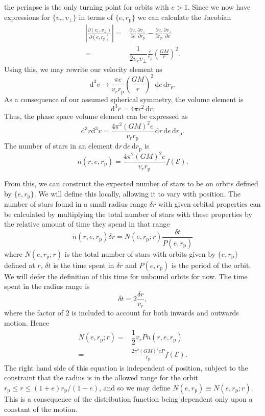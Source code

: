 \documentclass[useAMS,usedcolumn,usegraphicx,usenatbib]{mn2e}
\newcommand{\sub}[1]{\ensuremath{_\mathrm{#1}}}
\newcommand{\dd}{\ensuremath{\mathrm{d}}}
\newcommand{\partialdiff}[2]{\ensuremath{\frac{\partial {#1}}{\partial {#2}}}}
\newcommand{\recip}[1]{\ensuremath{\dfrac{1}{#1}}}
\begin{document}
the periapse is the only turning point for orbits with $e > 1$. Since we now have expressions for $\{v_r, v_\perp\}$ in terms of $\{e, r\sub{p}\}$ we can calculate the Jacobian
\begin{align}
\left|\frac{\partial(v_r, v_\perp)}{\partial(e, r\sub{p})}\right| = {} & \partialdiff{v_r}{e}\partialdiff{v_\perp}{r\sub{p}} - \partialdiff{v_r}{r\sub{p}}\partialdiff{v_\perp}{e} \\
 = {} & \recip{2v_rv_\perp}\frac{e}{r\sub{p}}\left(\frac{GM}{r}\right)^2.
\end{align}
Using this, we may rewrite our velocity element as
\begin{equation}
\dd^3v \rightarrow \frac{\pi e}{v_rr\sub{p}}\left(\frac{GM}{r}\right)^2\,\dd e \,\dd r\sub{p}.
\end{equation}
As a consequence of our assumed spherical symmetry, the volume element is
\begin{equation}
\dd^3r = 4\pi r^2 \,\dd r.
\end{equation}
Thus, the phase space volume element can be expressed as
\begin{equation}
\dd^3r\dd^3v = \frac{4\pi^2(GM)^2e}{v_rr\sub{p}}\,\dd r\,\dd e \,\dd r\sub{p}.
\end{equation}
The number of stars in an element $\dd r\,\dd e\,\dd r\sub{p}$ is
\begin{equation}
n(r, e, r\sub{p}) = \frac{4\pi^2(GM)^2e}{v_rr\sub{p}}f(\mathcal{E}).
\end{equation}

From this, we can construct the expected number of stars to be on orbits defined by $\{e, r\sub{p}\}$. We will define this locally, allowing it to vary with position. The number of stars found in a small radius range $\delta r$ with given orbital properties can be calculated by multiplying the total number of stars with these properties by the relative amount of time they spend in that range
\begin{equation}
n(r, e, r\sub{p})\delta r = N(e, r\sub{p}; r)\frac{\delta t}{P(e, r\sub{p})}
\end{equation}
where $N(e, r\sub{p}; r)$ is the total number of stars with orbits given by $\{e, r\sub{p}\}$ defined at $r$, $\delta t$ is the time spent in $\delta r$ and $P(e, r\sub{p})$ is the period of the orbit. We will defer the definition of this time for unbound orbits for now. The time spent in the radius range is
\begin{equation}
\delta t = 2\frac{\delta r}{v_r},
\end{equation}
where the factor of $2$ is included to account for both inwards and outwards motion. Hence
\begin{align}
N(e, r\sub{p}; r) = {} & \recip{2} v_r P n(r, e, r\sub{p})\\
 = {} & \frac{2\pi^2(GM)^2 e P}{r\sub{p}}f(\mathcal{E}).
\end{align}
The right hand side of this equation is independent of position, subject to the constraint that the radius is in the allowed range for the orbit $r\sub{p} \leq r \leq (1+e)r\sub{p}/(1-e)$, and so we may define $N(e, r\sub{p}) \equiv N(e, r\sub{p}; r)$. This is a consequence of the distribution function being dependent only upon a constant of the motion.
\end{document}
